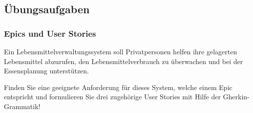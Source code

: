 \documentclass[acmtog]{acmart}
\begin{document}
\subsection{Übungsaufgaben}
\subsubsection{Epics und User Stories}
Ein Lebensmittelverwaltungssystem soll Privatpersonen helfen ihre gelagerten Lebensmittel abzurufen,
den Lebensmittelverbrauch zu überwachen und bei der Essensplanung unterstützen.

Finden Sie eine geeignete Anforderung für dieses System, welche einem Epic entspricht und formulieren Sie drei zugehörige
User Stories mit Hilfe der Gherkin-Grammatik!
\end{document}
